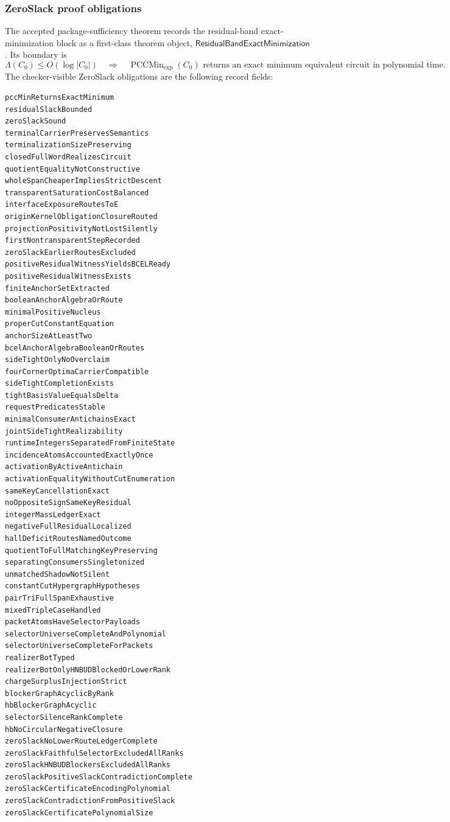 \documentclass[10.5pt,a4paper]{article}
\newcommand{\PCCMin}{\operatorname{PCCMin}_{\exp}}
\begin{document}
\subsubsection{ZeroSlack proof obligations}
The accepted package-sufficiency theorem records the residual-band exact-minimization block as a first-class theorem object, \(\mathsf{ResidualBandExactMinimization}\).  Its boundary is
\[
 \Lambda(C_0)\le O(\log |C_0|)
 \quad\Longrightarrow\quad
 \PCCMin(C_0)\text{ returns an exact minimum equivalent circuit in polynomial time}.
\]
The checker-visible ZeroSlack obligations are the following record fields:
\begin{lstlisting}
pccMinReturnsExactMinimum
residualSlackBounded
zeroSlackSound
terminalCarrierPreservesSemantics
terminalizationSizePreserving
closedFullWordRealizesCircuit
quotientEqualityNotConstructive
wholeSpanCheaperImpliesStrictDescent
transparentSaturationCostBalanced
interfaceExposureRoutesToE
originKernelObligationClosureRouted
projectionPositivityNotLostSilently
firstNontransparentStepRecorded
zeroSlackEarlierRoutesExcluded
positiveResidualWitnessYieldsBCELReady
positiveResidualWitnessExists
finiteAnchorSetExtracted
booleanAnchorAlgebraOrRoute
minimalPositiveNucleus
properCutConstantEquation
anchorSizeAtLeastTwo
bcelAnchorAlgebraBooleanOrRoutes
sideTightOnlyNoOverclaim
fourCornerOptimaCarrierCompatible
sideTightCompletionExists
tightBasisValueEqualsDelta
requestPredicatesStable
minimalConsumerAntichainsExact
jointSideTightRealizability
runtimeIntegersSeparatedFromFiniteState
incidenceAtomsAccountedExactlyOnce
activationByActiveAntichain
activationEqualityWithoutCutEnumeration
sameKeyCancellationExact
noOppositeSignSameKeyResidual
integerMassLedgerExact
negativeFullResidualLocalized
hallDeficitRoutesNamedOutcome
quotientToFullMatchingKeyPreserving
separatingConsumersSingletonized
unmatchedShadowNotSilent
constantCutHypergraphHypotheses
pairTriFullSpanExhaustive
mixedTripleCaseHandled
packetAtomsHaveSelectorPayloads
selectorUniverseCompleteAndPolynomial
selectorUniverseCompleteForPackets
realizerBotTyped
realizerBotOnlyHNBUDBlockedOrLowerRank
chargeSurplusInjectionStrict
blockerGraphAcyclicByRank
hbBlockerGraphAcyclic
selectorSilenceRankComplete
hbNoCircularNegativeClosure
zeroSlackNoLowerRouteLedgerComplete
zeroSlackFaithfulSelectorExcludedAllRanks
zeroSlackHNBUDBlockersExcludedAllRanks
zeroSlackPositiveSlackContradictionComplete
zeroSlackCertificateEncodingPolynomial
zeroSlackContradictionFromPositiveSlack
zeroSlackCertificatePolynomialSize
\end{lstlisting}
\end{document}
